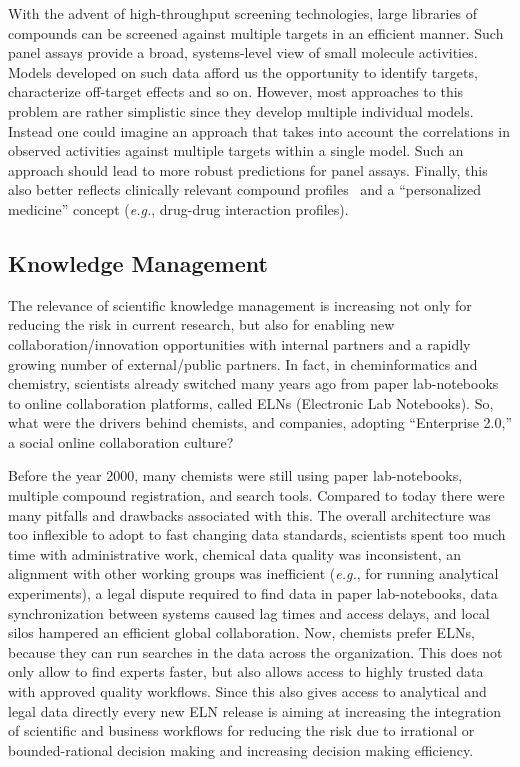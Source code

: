 \documentclass{sig-alternate}
\begin{document}
With the advent of high-throughput screening technologies, large libraries of
compounds can be screened against multiple targets in an efficient manner. Such
panel assays provide a broad, systems-level view of small molecule activities.
Models developed on such data afford us the opportunity to identify targets,
characterize off-target effects and so on. However, most approaches to this
problem are rather simplistic since they develop multiple individual models.
Instead one could imagine an approach that takes into account the correlations
in observed activities against multiple targets within a single model. Such an
approach should lead to more robust predictions for panel assays. Finally,
this also better reflects clinically relevant compound profiles~\cite{kuhn2010}
and a ``personalized medicine'' concept (\emph{e.g.}, drug-drug interaction profiles).

\subsection{Knowledge Management}
\label{sec:knowledge-management}

The relevance of scientific knowledge management is increasing not only for
reducing the risk in current research, but also for enabling new
collaboration/innovation opportunities with internal partners and a rapidly growing
number of external/public partners. In fact, in cheminformatics and chemistry,
scientists already switched many years ago from paper lab-notebooks to
online collaboration platforms, called ELNs (Electronic Lab Notebooks). So, what were the drivers behind chemists, and
companies, adopting ``Enterprise 2.0,'' a social online collaboration culture?

Before the year 2000, many chemists were still using paper
lab-notebooks, multiple compound registration, and search tools. Compared to
today there were many pitfalls and drawbacks associated with this. The overall architecture
was too inflexible to adopt to fast changing data standards, scientists spent
too much time with administrative work, chemical data quality was inconsistent,
an alignment with other working groups was inefficient (\emph{e.g.}, for running
analytical experiments), a legal dispute required to find data in paper
lab-notebooks, data synchronization between systems caused lag times and access
delays, and local silos hampered an efficient global collaboration. Now,
chemists prefer ELNs, because they can run searches in the data across the organization. This does
not only allow to find experts faster, but also allows access to highly trusted
data with approved quality workflows. Since this also gives access to
analytical and legal data directly every new ELN release is aiming at increasing
the integration of scientific and business workflows for reducing the risk due
to irrational or bounded-rational decision making and increasing decision making
efficiency.
\end{document}
